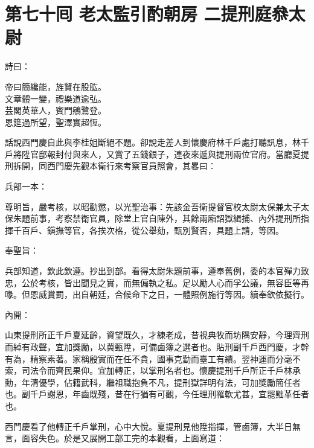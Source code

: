 
\chapter*{第七十囘 老太監引酌朝房 二提刑庭叅太尉}


詩曰：

\begin{myquote} 
帝曰簡纔能，旌賢在股肱。\\文章體一變，禮樂道逾弘。\\芸閣英華人，賓門鵷鷺登。\\恩筵過所望，聖澤實超恆。
\end{myquote} 

話說西門慶自此與李桂姐斷絕不題。卻說走差人到懷慶府林千戶處打聽訊息，林千戶將陞官邸報封付與來人，又賞了五錢銀子，連夜來遞與提刑兩位官府。當廳夏提刑拆開，同西門慶先觀本衛行來考察官員照會，其畧曰：

\begin{myquote}[\markfont]
兵部一本：

尊明旨，嚴考核，以昭勸懲，以光聖治事：先該金吾衛提督官校太尉太保兼太子太保朱題前事，考察禁衛官員，除堂上官自陳外，其餘兩廂詔獄緝捕、內外提刑所指揮千百戶、鎭撫等官，各挨次格，從公舉劾，甄別賢否，具題上請，等因。

奉聖旨：

兵部知道，欽此欽遵。抄出到部。看得太尉朱題前事，遵奉舊例，委的本官殫力致忠，公於考核，皆出聞見之實，而無偏執之私。足以勵人心而孚公議，無容臣等再喙。但恩威賞罰，出自朝廷，合候命下之日，一體照例施行等因。續奉欽依擬行。

內開：

山東提刑所正千戶夏延齡，資望既久，才練老成，昔視典牧而坊隅安靜，今理齊刑而綽有政聲，宜加獎勵，以冀甄陞，可備鹵簿之選者也。貼刑副千戶西門慶，才幹有為，精察素著。家稱殷實而在任不貪，國事克勤而臺工有績。翌神運而分毫不索，司法令而齊民果仰。宜加轉正，以掌刑名者也。懷慶提刑千戶所正千戶林承勳，年清優學，佔籍武科，繼祖職抱負不凡，提刑獄詳明有法，可加獎勵簡任者也。副千戶謝恩，年齒既殘，昔在行猶有可觀，今任理刑罹軟尤甚，宜罷黜革任者也。
\end{myquote} 

西門慶看了他轉正千戶掌刑，心中大悅。夏提刑見他陞指揮，管鹵簿，大半日無言，面容失色。於是又展開工部工完的本觀看，上面寫道：

